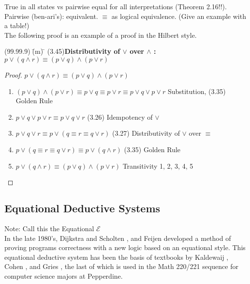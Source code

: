 \documentclass[fleqn, leqno]{article}
\newcommand{\lgap}{2pt}                             %
\begin{document}
True in all states vs pairwise equal for all interpretations (Theorem 2.16!!).  Pairwise (ben-ari's): equivalent.  $\equiv$ as logical equivalence.  (Give an example with a table!)\\

The following proof is an example of a proof in the Hilbert style.\\

\begin{tabbing}
(99.99.9)$\;$\=(m)$\;$\=\kill
(3.45)\>\textbf{Distributivity of $\lor$ over $\land$ :}\quad $p\lor (q\land r)\equiv (p\lor q)\land (p\lor r)$\\[\lgap]
\end{tabbing}

\begin{proof}
$p\lor (q\land r)\equiv (p\lor q)\land (p\lor r)$
\begin{enumerate}
 \item $(p\lor q)\land (p\lor r)\equiv p\lor q\equiv p\lor r\equiv p\lor q\lor p\lor r$ \hfill Substitution, (3.35) Golden Rule
 \item $p\lor q\lor p\lor r\equiv p\lor q\lor r$ \hfill (3.26) Idempotency of $\lor$
 \item $p\lor q\lor r\equiv p\lor (q\equiv r\equiv q\lor r)$ \hfill (3.27) Distributivity of $\lor$ over $\equiv$
 \item $p\lor (q\equiv r\equiv q\lor r)\equiv p\lor (q\land r)$ \hfill (3.35) Golden Rule
 \item $p\lor (q\land r)\equiv (p\lor q)\land (p\lor r)$ \hfill Transitivity 1, 2, 3, 4, 5
\end{enumerate}
\end{proof}

\subsection{Equational Deductive Systems}

Note: Call this the Equational $\mathcal{E}$\\[\lgap]
In the late 1980's, Dijkstra and Scholten \cite{DandS}, and Feijen \cite{Feij} developed a method of proving
programs correctness with a new logic based on an equational style.
This equational deductive system has been the basis of textbooks by Kaldewaij \cite{Kald}, Cohen \cite{Cohen}, and Gries \cite{LADM},
the last of which is used in the Math 220/221 sequence for computer science majors at Pepperdine.\\
\end{document}
